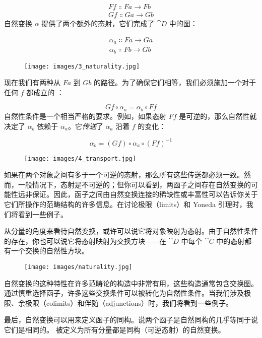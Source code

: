\begin{gather*}
  F f \Colon F a \to F b \\
  G f \Colon G a \to G b
\end{gather*}
自然变换 $\alpha$ 提供了两个额外的态射，它们完成了 $\cat{D}$ 中的图：

\begin{gather*}
  \alpha_a \Colon F a \to G a \\
  \alpha_b \Colon F b \to G b
\end{gather*}

\begin{figure}[H]
  \centering
  \texttt{[image: images/3\_naturality.jpg]}
\end{figure}

\noindent
现在我们有两种从 $F a$ 到 $G b$ 的路径。为了确保它们相等，我们必须施加一个对于任何 $f$ 都成立的 ：

\[G f \circ \alpha_a = \alpha_b \circ F f\]
自然性条件是一个相当严格的要求。例如，如果态射 $F f$ 是可逆的，那么自然性就决定了 $\alpha_b$ 依赖于 $\alpha_a$。它\emph{传送}了 $\alpha_a$ 沿着 $f$ 的变化：

\[\alpha_b = (G f) \circ \alpha_a \circ (F f)^{-1}\]

\begin{figure}[H]
  \centering
  \texttt{[image: images/4\_transport.jpg]}
\end{figure}

\noindent
如果在两个对象之间有多于一个可逆的态射，那么所有这些传送都必须一致。然而，一般情况下，态射是不可逆的；但你可以看到，两函子之间存在自然变换的可能性远非保证。因此，函子之间由自然变换连接的稀缺性或丰富性可以告诉你关于它们所操作的范畴结构的许多信息。在讨论极限（limits）和 Yoneda 引理时，我们将看到一些例子。

从分量的角度来看待自然变换，或许可以说它将对象映射为态射。由于自然性条件的存在，你也可以说它将态射映射为交换方块——在 $\cat{D}$ 中每个 $\cat{C}$ 中的态射都有一个交换的自然性方块。

\begin{figure}[H]
  \centering
  \texttt{[image: images/naturality.jpg]}
\end{figure}

\noindent
自然变换的这种特性在许多范畴论的构造中非常有用，这些构造通常包含交换图。通过慎重选择函子，许多这些交换条件可以被转化为自然性条件。当我们涉及极限、余极限（colimits）和伴随（adjunctions）时，我们将看到一些例子。

最后，自然变换可以用来定义函子的同构。说两个函子是自然同构的几乎等同于说它们是相同的。  被定义为所有分量都是同构（可逆态射）的自然变换。

